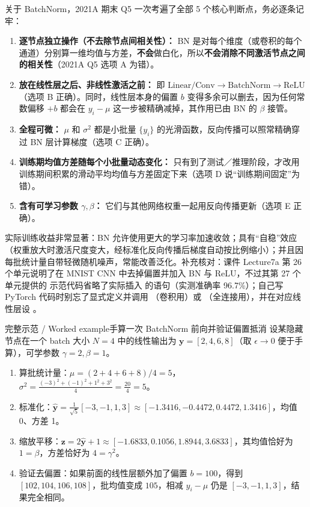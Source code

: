 关于 BatchNorm，2021A 期末 Q5 一次考遍了全部 5 个核心判断点，务必逐条记牢：
\begin{enumerate}
\item \textbf{逐节点独立操作（不去除节点间相关性）：} BN 是对每个维度（或卷积的每个通道）分别算一维均值与方差，\textbf{不会}做白化，所以\textbf{不会消除不同激活节点之间的相关性}（2021A Q5 选项 A 为错）。
\item \textbf{放在线性层之后、非线性激活之前：} 即 $\text{Linear/Conv} \to \text{BatchNorm} \to \text{ReLU}$（选项 B 正确）。同时，线性层本身的偏置 $b$ 变得多余可以删去，因为任何常数偏移 $+b$ 都会在 $y_i - \mu$ 这一步被精确减掉，其作用已由 BN 的 $\beta$ 接管。
\item \textbf{全程可微：} $\mu$ 和 $\sigma^2$ 都是小批量 $\{y_i\}$ 的光滑函数，反向传播可以照常精确穿过 BN 层计算梯度（选项 C 正确）。
\item \textbf{训练期均值方差随每个小批量动态变化：} 只有到了测试／推理阶段，才改用训练期间积累的滑动平均均值与方差固定下来（选项 D 说“训练期间固定”为错）。
\item \textbf{含有可学习参数 $\gamma,\beta$：} 它们与其他网络权重一起用反向传播更新（选项 E 正确）。
\end{enumerate}

实际训练收益非常显著：BN 允许使用更大的学习率加速收敛；具有“自稳”效应（权重放大时激活尺度变大，经标准化反向传播后梯度自动按比例缩小）；并且因每批统计量自带轻微随机噪声，常能改善泛化。补充核对：课件 Lecture7a 第 26 个单元说明了在 MNIST CNN 中去掉偏置并加入 BN 与 ReLU，不过其第 27 个单元提供的  示范代码省略了实际插入  的语句（实测准确率 96.7\%）；自己写 PyTorch 代码时别忘了显式定义并调用 （卷积用）或 （全连接用），并在对应线性层设 。

\begin{StudyBlock}{完整示范 / Worked example}{手算一次 BatchNorm 前向并验证偏置抵消}
设某隐藏节点在一个 batch 大小 $N=4$ 中的线性输出为 $\mathbf{y}=[2, 4, 6, 8]$（取 $\epsilon\to 0$ 便于手算），可学参数 $\gamma=2, \beta=1$。
\begin{enumerate}
\item 算批统计量：$\mu = (2+4+6+8)/4 = 5$，$\sigma^2 = \frac{(-3)^2+(-1)^2+1^2+3^2}{4} = \frac{20}{4} = 5$。
\item 标准化：$\hat{\mathbf{y}} = \frac{1}{\sqrt{5}}[-3, -1, 1, 3] \approx [-1.3416, -0.4472, 0.4472, 1.3416]$，均值 0、方差 1。
\item 缩放平移：$\mathbf{z} = 2\hat{\mathbf{y}} + 1 \approx [-1.6833, 0.1056, 1.8944, 3.6833]$，其均值恰好为 $1=\beta$，方差恰好为 $4=\gamma^2$。
\item 验证去偏置：如果前面的线性层额外加了偏置 $b=100$，得到 $[102, 104, 106, 108]$，批均值变成 $105$，相减 $y_i-\mu$ 仍是 $[-3,-1,1,3]$，结果完全相同。
\end{enumerate}
\end{StudyBlock}

